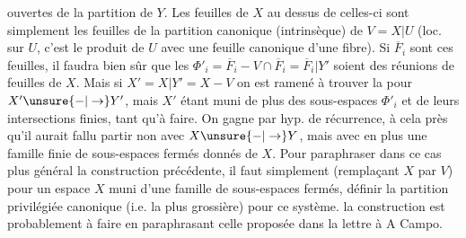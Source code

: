 ouvertes de la partition  de $Y$. Les feuilles de $X$ au dessus de celles-ci sont simplement les feuilles de la partition  canonique (intrinsèque) de $V=X|U$ (loc. sur $U$, c'est le produit de $U$ avec une feuille canonique d'une fibre). Si $\overline F_i$ sont ces feuilles, il faudra bien sûr que les $\Phi'_i=\overline F_i-V\cap\overline F_i=\overline F_i|Y'$ soient des réunions de feuilles de $X$.
Mais si $X'=X|Y'=X-V$ on est ramené à trouver la  pour $X'\unsure{-|\to}Y'$, mais $X'$ étant muni de plus des sous-espaces $\Phi'_i$ et de leurs intersections finies, tant qu'à faire. On gagne par hyp. de récurrence, à cela près qu'il aurait fallu partir non avec $X\unsure{-|\to}Y$, mais avec en plus une famille finie de sous-espaces fermés donnés de $X$. Pour paraphraser dans ce cas plus général la construction précédente, il faut simplement (remplaçant $X$ par $V$) pour un espace $X$ muni d'une famille  de sous-espaces fermés, définir la  partition privilégiée canonique (i.e. la plus grossière) pour ce système.  la construction est probablement à faire en paraphrasant celle proposée dans la  lettre à A Campo.
